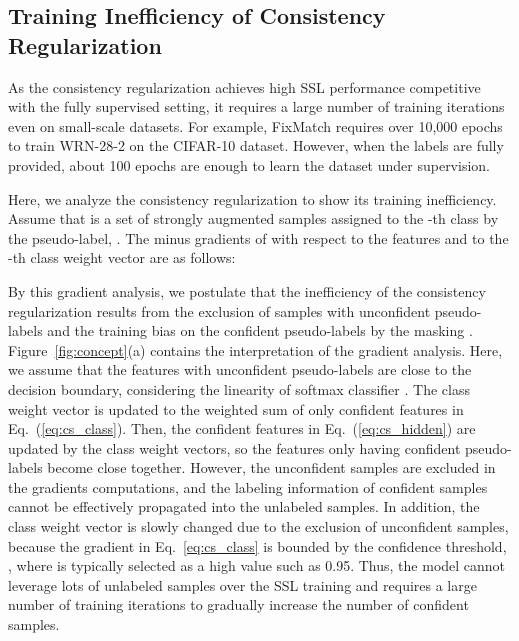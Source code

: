 \documentclass[letterpaper]{article} \usepackage{aaai22}  \usepackage{times}  \usepackage{helvet}  \usepackage{courier}  \usepackage[hyphens]{url}  \usepackage{graphicx} \urlstyle{rm} \def\UrlFont{\rm}  \usepackage{natbib}  \usepackage{caption} \DeclareCaptionStyle{ruled}{labelfont=normalfont,labelsep=colon,strut=off} \frenchspacing  \setlength{\pdfpagewidth}{8.5in}  \setlength{\pdfpageheight}{11in}  \usepackage{algorithm}
\begin{document}
\subsection{Training Inefficiency of Consistency Regularization} \label{sec:grad_cs}
As the consistency regularization achieves high SSL performance competitive with the fully supervised setting, it requires a large number of training iterations even on small-scale datasets.
For example, FixMatch \cite{sohn2020fixmatch} requires over 10,000 epochs to train WRN-28-2 \cite{zagoruyko2016wide} on the CIFAR-10 dataset.
However, when the labels are fully provided, about 100 epochs are enough to learn the dataset under supervision.

Here, we analyze the consistency regularization to show its training inefficiency.
Assume that  is a set of strongly augmented samples assigned to the -th class by the pseudo-label, .
The minus gradients of  with respect to the features  and to the -th class weight vector  are as follows:


By this gradient analysis, we postulate that the inefficiency of the consistency regularization results from the exclusion of samples with unconfident pseudo-labels and the training bias on the confident pseudo-labels by the masking .
Figure~\ref{fig:concept}(a) contains the interpretation of the gradient analysis.
Here, we assume that the features with unconfident pseudo-labels are close to the decision boundary, considering the linearity of softmax classifier \cite{bishop2006pattern}.
The class weight vector  is updated to the weighted sum of only confident features in Eq.~(\ref{eq:cs_class}).
Then, the confident features in Eq.~(\ref{eq:cs_hidden}) are updated by the class weight vectors, so the features only having confident pseudo-labels become close together.
However, the unconfident samples are excluded in the gradients computations, and the labeling information of confident samples cannot be effectively propagated into the unlabeled samples.
In addition, the class weight vector is slowly changed due to the exclusion of unconfident samples, because the gradient in Eq.~\ref{eq:cs_class} is bounded by the confidence threshold, , where  is typically selected as a high value such as 0.95.
Thus, the model cannot leverage lots of unlabeled samples over the SSL training and requires a large number of training iterations to gradually increase the number of confident samples. 
\end{document}
